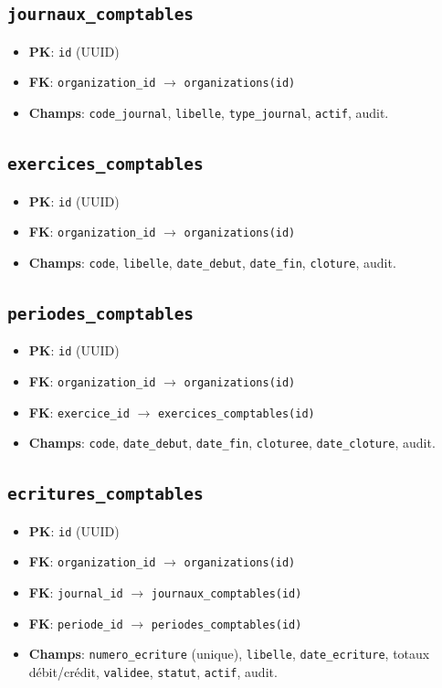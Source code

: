 \subsection{\texttt{journaux\_comptables}}
\begin{itemize}
  \item \textbf{PK}: \texttt{id} (UUID)
  \item \textbf{FK}: \texttt{organization\_id} \(\rightarrow\) \texttt{organizations(id)}
  \item \textbf{Champs}: \texttt{code\_journal}, \texttt{libelle}, \texttt{type\_journal}, \texttt{actif}, audit.
\end{itemize}

\subsection{\texttt{exercices\_comptables}}
\begin{itemize}
  \item \textbf{PK}: \texttt{id} (UUID)
  \item \textbf{FK}: \texttt{organization\_id} \(\rightarrow\) \texttt{organizations(id)}
  \item \textbf{Champs}: \texttt{code}, \texttt{libelle}, \texttt{date\_debut}, \texttt{date\_fin}, \texttt{cloture}, audit.
\end{itemize}

\subsection{\texttt{periodes\_comptables}}
\begin{itemize}
  \item \textbf{PK}: \texttt{id} (UUID)
  \item \textbf{FK}: \texttt{organization\_id} \(\rightarrow\) \texttt{organizations(id)}
  \item \textbf{FK}: \texttt{exercice\_id} \(\rightarrow\) \texttt{exercices\_comptables(id)}
  \item \textbf{Champs}: \texttt{code}, \texttt{date\_debut}, \texttt{date\_fin}, \texttt{cloturee}, \texttt{date\_cloture}, audit.
\end{itemize}

\subsection{\texttt{ecritures\_comptables}}
\begin{itemize}
  \item \textbf{PK}: \texttt{id} (UUID)
  \item \textbf{FK}: \texttt{organization\_id} \(\rightarrow\) \texttt{organizations(id)}
  \item \textbf{FK}: \texttt{journal\_id} \(\rightarrow\) \texttt{journaux\_comptables(id)}
  \item \textbf{FK}: \texttt{periode\_id} \(\rightarrow\) \texttt{periodes\_comptables(id)}
  \item \textbf{Champs}: \texttt{numero\_ecriture} (unique), \texttt{libelle}, \texttt{date\_ecriture}, totaux débit/crédit, \texttt{validee}, \texttt{statut}, \texttt{actif}, audit.
\end{itemize}

